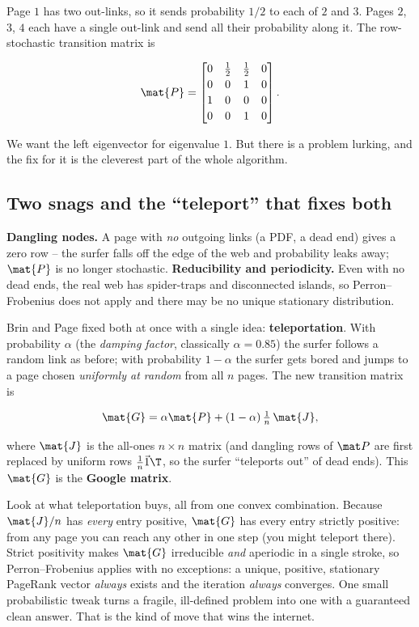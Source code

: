 Page $1$ has two out-links, so it sends probability $1/2$ to each of $2$ and $3$. Pages $2$,
$3$, $4$ each have a single out-link and send all their probability along it. The
row-stochastic transition matrix is

\[
\mat{P} =
\begin{bmatrix}
0 & \tfrac12 & \tfrac12 & 0\\[2pt]
0 & 0 & 1 & 0\\[2pt]
1 & 0 & 0 & 0\\[2pt]
0 & 0 & 1 & 0
\end{bmatrix}.
\]

We want the left eigenvector for eigenvalue $1$. But there is a problem lurking, and the fix
for it is the cleverest part of the whole algorithm.

\subsection{Two snags and the ``teleport'' that fixes both}

\textbf{Dangling nodes.} A page with \emph{no} outgoing links (a PDF, a dead end) gives a
zero row -- the surfer falls off the edge of the web and probability leaks away; $\mat{P}$
is no longer stochastic. \textbf{Reducibility and periodicity.} Even with no dead ends, the
real web has spider-traps and disconnected islands, so Perron--Frobenius does not apply and
there may be no unique stationary distribution.

Brin and Page fixed both at once with a single idea: \textbf{teleportation}. With
probability $\alpha$ (the \emph{damping factor}, classically $\alpha = 0.85$) the surfer
follows a random link as before; with probability $1-\alpha$ the surfer gets bored and jumps
to a page chosen \emph{uniformly at random} from all $n$ pages. The new transition matrix is

\[
\mat{G} = \alpha \mat{P} + (1-\alpha)\,\tfrac1n\,\mat{J},
\]

where $\mat{J}$ is the all-ones $n\times n$ matrix (and dangling rows of $\mat P$ are first
replaced by uniform rows $\tfrac1n\vec1\T$, so the surfer ``teleports out'' of dead ends).
This $\mat{G}$ is the \textbf{Google matrix}.

\begin{aestheticbox}
Look at what teleportation buys, all from one convex combination. Because $\mat{J}/n$ has
\emph{every} entry positive, $\mat{G}$ has every entry strictly positive: from any page you
can reach any other in one step (you might teleport there). Strict positivity makes
$\mat{G}$ irreducible \emph{and} aperiodic in a single stroke, so Perron--Frobenius applies
with no exceptions: a unique, positive, stationary PageRank vector \emph{always} exists and
the iteration \emph{always} converges. One small probabilistic tweak turns a fragile,
ill-defined problem into one with a guaranteed clean answer. That is the kind of move that
wins the internet.
\end{aestheticbox}

